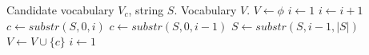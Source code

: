 \begin{algorithmic}[1]
\Require Candidate vocabulary $V_c$, string $S$.
\Ensure Vocabulary $V$.
\State $V \gets \phi$
\State $i \gets 1$
  \State $i \gets i + 1$
  \State $c \gets substr(S, 0, i)$
    \State $c \gets substr(S, 0, i - 1)$
    \State $S \gets substr(S, i - 1, |S|)$
    \State $V \gets V \cup \{ c \}$
    \State $i \gets 1$
  \EndIf
\EndWhile
\end{algorithmic}
